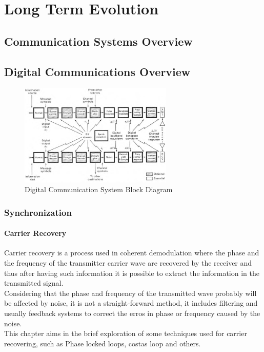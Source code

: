\chapter{Long Term Evolution}

\section{Communication Systems Overview}

\section{Digital Communications Overview}
\label{sec:digitalcomm}

\begin{figure}[htbp]
    \centering
    \includegraphics[width=0.65\textwidth]{./figures/digicomm_block}
    \caption{ Digital Communication System Block Diagram
    \label{fig:digcomm}}
\end{figure}

\subsection{Synchronization}

\subsubsection{Carrier Recovery}

Carrier recovery is a process used in coherent demodulation where the phase
and the frequency of the transmitter carrier wave are recovered by the receiver
and thus after having such information it is possible to extract the information
in the transmitted signal.\\
Considering that the phase and frequency of the transmitted wave probably will
be affected by noise, it is not a straight-forward method, it includes filtering
and usually feedback systems to correct the erros in phase or frequency caused
by the noise.\\
This chapter aims in the brief exploration of some techniques used for carrier
recovering, such as Phase locked loops, costas loop and others.\\

